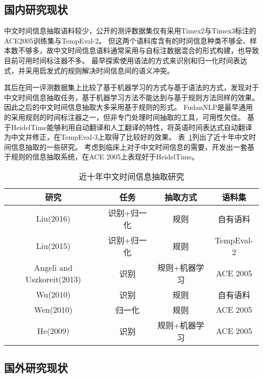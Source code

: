 \subsection{国内研究现状}

中文时间信息抽取语料较少，公开的测评数据集仅有采用Timex2与Timex3标注的ACE2005训练集与TempEval-2。
但这两个语料库含有的时间信息种类不够全、样本数不够多，故中文时间信息语料通常采用与自标注数据混合的形式构建，也导致目前可用时间标注器不多。
\citet{mingli2005ctemp}最早探索使用语法的方式来识别和归一化时间表达式，并采用启发式的规则解决时间信息间的语义冲突。

其后\citet{wu2005normalizing}在同一评测数据集上比较了基于机器学习的方式与基于语法的方式，发现对于中文时间信息抽取任务，基于机器学习方法不能达到与基于规则方法同样的效果。因此之后的中文时间信息抽取大多采用基于规则的形式。
FudanNLP\cite{qiu2013fudannlp}是最早通用的采用规则的时间标注器之一，但非专门处理时间抽取的工具，可用性欠佳。
\citet{li2014chinese}基于HeidelTime能够利用自动翻译和人工翻译的特性，将英语时间表达式自动翻译为中文并修正，在TempEval-3上取得了比较好的效果。
表~\ref{tab:research}列出了近十年中文时间信息抽取的一些研究。
\citet{liu2016cmedtex}考虑到临床上对于中文时间信息的需要，开发出一套基于规则的信息抽取系统，在ACE 2005上表现好于HeidelTime。

\begin{table}[h]
    \centering
    \caption{近十年中文时间信息抽取研究}
    \begin{tabular}{*{4}{c}}
        \toprule
        研究                       & 任务        & 抽取方式      & 语料集     \\
        \midrule
        Liu(2016)                  & 识别+归一化 & 规则          & 自有语料   \\
        Liu(2015)                  & 识别+归一化 & 规则          & TempEval-2 \\
        Angeli and Uszkoreit(2013) & 识别        & 规则+机器学习 & ACE 2005   \\
        Wu(2010)                   & 识别        & 规则          & 自有语料   \\
        Wen(2010)                  & 归一化      & 规则          & ACE 2005   \\
        He(2009)                   & 识别        & 规则+机器学习 & ACE 2005   \\
        \bottomrule
    \end{tabular}
    \label{tab:research}
\end{table}


\subsection{国外研究现状}

